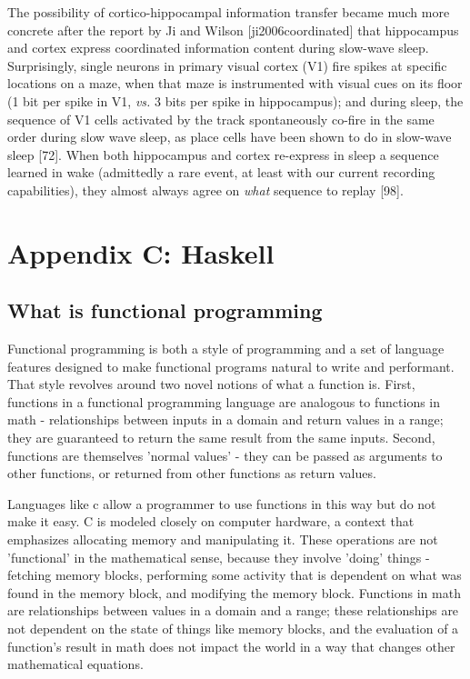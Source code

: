 \documentclass[]{article}
\let\stdsection\section
\renewcommand\section{\newpage\stdsection}
\begin{document}
The possibility of cortico-hippocampal information transfer became much
more concrete after the report by Ji and Wilson {[}ji2006coordinated{]}
that hippocampus and cortex express coordinated information content
during slow-wave sleep. Surprisingly, single neurons in primary visual
cortex (V1) fire spikes at specific locations on a maze, when that maze
is instrumented with visual cues on its floor (1 bit per spike in V1,
\emph{vs.} 3 bits per spike in hippocampus); and during sleep, the
sequence of V1 cells activated by the track spontaneously co-fire in the
same order during slow wave sleep, as place cells have been shown to do
in slow-wave sleep {[}72{]}. When both hippocampus and cortex re-express
in sleep a sequence learned in wake (admittedly a rare event, at least
with our current recording capabilities), they almost always agree on
\emph{what} sequence to replay {[}98{]}.

\section{Appendix C: Haskell}

\subsection{What is functional programming}

Functional programming is both a style of programming and a set of
language features designed to make functional programs natural to write
and performant. That style revolves around two novel notions of what a
function is. First, functions in a functional programming language are
analogous to functions in math - relationships between inputs in a
domain and return values in a range; they are guaranteed to return the
same result from the same inputs. Second, functions are themselves
'normal values' - they can be passed as arguments to other functions, or
returned from other functions as return values.

Languages like c allow a programmer to use functions in this way but do
not make it easy. C is modeled closely on computer hardware, a context
that emphasizes allocating memory and manipulating it. These operations
are not 'functional' in the mathematical sense, because they involve
'doing' things - fetching memory blocks, performing some activity that
is dependent on what was found in the memory block, and modifying the
memory block. Functions in math are relationships between values in a
domain and a range; these relationships are not dependent on the state
of things like memory blocks, and the evaluation of a function's result
in math does not impact the world in a way that changes other
mathematical equations.
\end{document}

